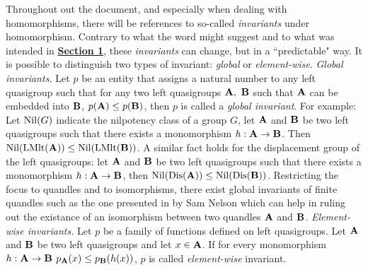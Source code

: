 \documentclass{mcom-l}
\begin{document}
Throughout out the document, and especially when dealing with homomorphisms, there will be references to so-called \emph{invariants} under homomorphism. Contrary to what the word might suggest and to what was intended in \hyperref[intro1Connected]{\textbf{Section 1}}, these \emph{invariants} can change, but in a ``predictable" way.\newline
It is possible to distinguish two types of invariant: \emph{global} or \emph{element-wise}.\newline\newline
\textit{Global invariants.}\newline
Let $p$ be an entity that assigns a natural number to any left quasigroup such that for any two left quasigroups $\mathbf{A},~\mathbf{B}$ such that $\mathbf{A}$ can be embedded into $\mathbf{B}$, $p(\mathbf{A})\leq p(\mathbf{B})$, then $p$ is called a \emph{global invariant}. For example:\newline
Let $\operatorname{Nil}(G)$ indicate the nilpotency class of a group $G$, let $\mathbf{A}$ and $\mathbf{B}$ be two left quasigroups such that there exists a monomorphism $h : \mathbf{A} \to \mathbf{B}$. \newline Then $\operatorname{Nil}(\operatorname{LMlt}(\mathbf{A})) \leq \operatorname{Nil}(\operatorname{LMlt}(\mathbf{B}))$. A similar fact holds for the displacement group of the left quasigroups: let $\mathbf{A}$ and $\mathbf{B}$ be two left quasigroups such that there exists a monomorphism $h : \mathbf{A} \to \mathbf{B}$, then $\operatorname{Nil}(\operatorname{Dis}(\mathbf{A})) \leq \operatorname{Nil}(\operatorname{Dis}(\mathbf{B}))$.
\newline
Restricting the focus to quandles and to isomorphisms, there exist global invariants of finite quandles such as the one presented in \cite{nelson2008polynomial} by Sam Nelson which can help in ruling out the existance of an isomorphism between two quandles $\mathbf{A}$ and $\mathbf{B}$.\newline\newline
\textit{Element-wise invariants.}\newline
Let $p$ be a family of functions defined on left quasigroups.\newline
Let $\mathbf{A}$ and $\mathbf{B}$ be two left quasigroups and let $x\in \mathbf{A}$. If for every monomorphism $h :\mathbf{A} \to \mathbf{B}$ $p_\mathbf{A}(x) \leq p_\mathbf{B}(h(x))$, $p$ is called \emph{element-wise} invariant.\newline
\end{document}
